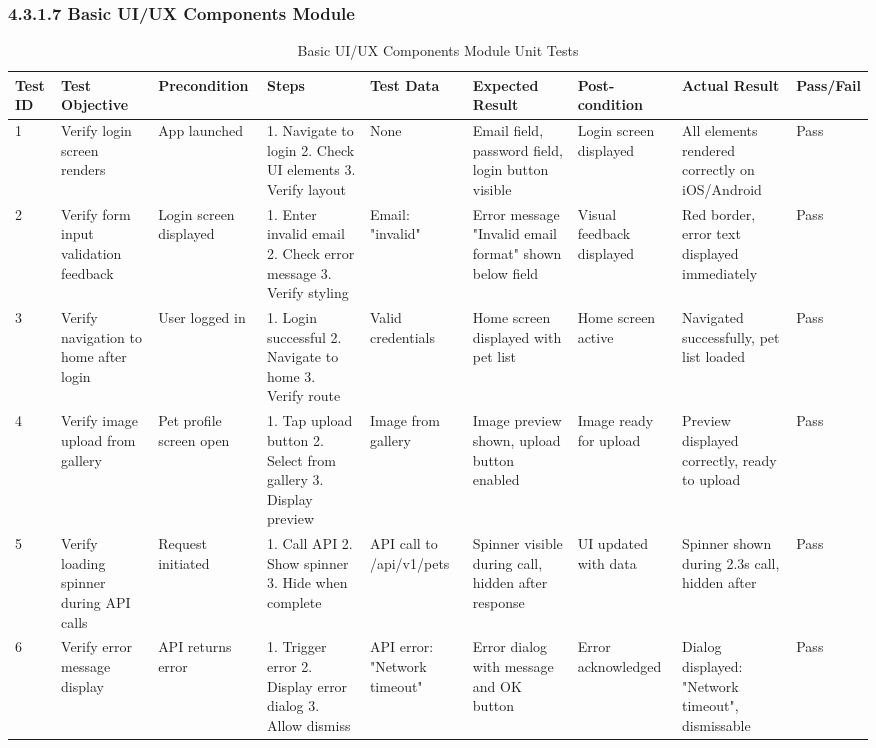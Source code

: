 \subsubsection{4.3.1.7 Basic UI/UX Components Module}

\begin{table}[H]
\centering
\caption{Basic UI/UX Components Module Unit Tests}
\tiny
\begin{tabular}{|p{0.4cm}|p{2cm}|p{1.2cm}|p{2cm}|p{2cm}|p{2cm}|p{1.5cm}|p{2cm}|p{0.7cm}|}
\hline
\textbf{Test ID} & \textbf{Test Objective} & \textbf{Precondition} & \textbf{Steps} & \textbf{Test Data} & \textbf{Expected Result} & \textbf{Post-condition} & \textbf{Actual Result} & \textbf{Pass/Fail} \\ \hline
1 & Verify login screen renders & App launched & 1. Navigate to login 2. Check UI elements 3. Verify layout & None & Email field, password field, login button visible & Login screen displayed & All elements rendered correctly on iOS/Android & Pass \\ \hline
2 & Verify form input validation feedback & Login screen displayed & 1. Enter invalid email 2. Check error message 3. Verify styling & Email: "invalid" & Error message "Invalid email format" shown below field & Visual feedback displayed & Red border, error text displayed immediately & Pass \\ \hline
3 & Verify navigation to home after login & User logged in & 1. Login successful 2. Navigate to home 3. Verify route & Valid credentials & Home screen displayed with pet list & Home screen active & Navigated successfully, pet list loaded & Pass \\ \hline
4 & Verify image upload from gallery & Pet profile screen open & 1. Tap upload button 2. Select from gallery 3. Display preview & Image from gallery & Image preview shown, upload button enabled & Image ready for upload & Preview displayed correctly, ready to upload & Pass \\ \hline
5 & Verify loading spinner during API calls & Request initiated & 1. Call API 2. Show spinner 3. Hide when complete & API call to /api/v1/pets & Spinner visible during call, hidden after response & UI updated with data & Spinner shown during 2.3s call, hidden after & Pass \\ \hline
6 & Verify error message display & API returns error & 1. Trigger error 2. Display error dialog 3. Allow dismiss & API error: "Network timeout" & Error dialog with message and OK button & Error acknowledged & Dialog displayed: "Network timeout", dismissable & Pass \\ \hline

\end{tabular}
\end{table}
